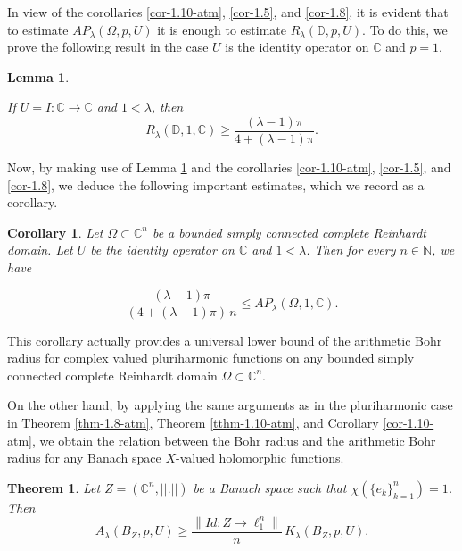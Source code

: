 \documentclass[a4paper,11pt, reqno]{amsart}
\newtheorem{thm}{Theorem}[section]
\newtheorem{cor}{Corollary}[section]
\newtheorem{lem}{Lemma}[section]
\theoremstyle{definition}
\newcommand{\norm}[1]{\left\lVert#1\right\rVert}
\newcommand{\comment}[1]{}
\begin{document}
In view of the corollaries \ref{cor-1.10-atm}, \ref{cor-1.5}, and \ref{cor-1.8}, it is evident that to estimate $AP_\lambda(\Omega,p, U)$ it is enough to estimate $R_\lambda(\mathbb{D},p,U)$. To do this, we prove the following result in the case $U$ is the identity operator on $\mathbb{C}$ and $p=1$.
\begin{lem} \label{lem-1.1}
	
If $U=I:\mathbb{C} \rightarrow \mathbb{C}$ and $1 <\lambda$, then 
	\begin{equation*}
	R_\lambda(\mathbb{D},1,\mathbb{C}) \geq \frac{(\lambda-1)\pi}{4+(\lambda-1)\pi}.
	\end{equation*}
 \comment{If $U=I:\mathcal{B}(\mathcal{H}) \rightarrow \mathcal{B}(\mathcal{H})$ and $1 <\lambda$, then
 	\begin{equation*}
 		R_\lambda(\mathbb{D},1,\mathcal{B}(\mathcal{H})) \geq 	
 \end{equation*}}
\end{lem}
 Now, by making use of Lemma \ref{lem-1.1} and the corollaries \ref{cor-1.10-atm}, \ref{cor-1.5}, and \ref{cor-1.8}, we deduce the following important estimates, which we record as a corollary.
 \begin{cor}
 Let $\Omega \subset \mathbb{C}^n$ be a bounded simply connected complete Reinhardt domain. Let $U$ be the identity operator on $\mathbb{C}$ and $1 <\lambda$. Then for every $n \in \mathbb{N}$, we have
   
 	$$
 	\frac{(\lambda-1)\pi}{(4+(\lambda-1)\pi)\,n} \leq AP_\lambda(\Omega,1, \mathbb{C}).
 	$$
 \end{cor}
 This corollary actually provides a universal lower bound of the arithmetic Bohr radius for complex valued pluriharmonic functions on any bounded simply connected complete Reinhardt domain $\Omega \subset \mathbb{C}^n$.
 \vspace{1mm}
  
On the other hand, by applying the same arguments as in the pluriharmonic case in Theorem \ref{thm-1.8-atm}, Theorem \ref{tthm-1.10-atm}, and Corollary \ref{cor-1.10-atm}, we obtain the relation between the Bohr radius and the arithmetic Bohr radius for any Banach space $X$-valued holomorphic functions.
\begin{thm} \label{thm-1.8-atm-holo}
	Let $Z=(\mathbb{C}^n, ||.||)$ be a Banach space such that $\chi(\{e_k\}^n_{k=1})=1$. Then 
	\begin{equation*}
		A_\lambda(B_{Z},p,U) \geq \frac{\norm{Id: Z \rightarrow \ell^n_{1}}}{n} \, K_\lambda(B_{Z},p,U).
	\end{equation*}
\end{thm}
\end{document}
